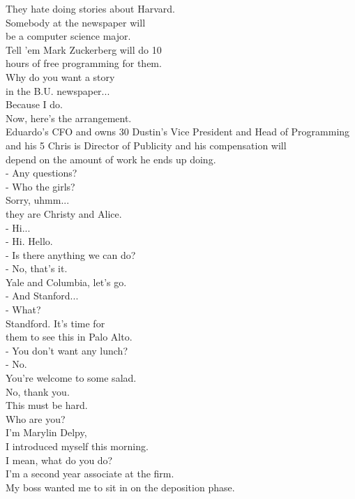 \documentclass{article}
\begin{document}
\begin{multicols}{3}
They hate doing stories about Harvard.\\
Somebody at the newspaper will\\
be a computer science major.\\
Tell 'em Mark Zuckerberg will do 10\\
hours of free programming for them.\\
Why do you want a story\\
in the B.U. newspaper...\\
Because I do.\\
Now, here's the arrangement.\\
Eduardo's CFO and owns 30%
Dustin's Vice President and Head of Programming\\
and his 5%
Chris is Director of Publicity and his compensation will\\
depend on the amount of work he ends up doing.\\
- Any questions?\\
- Who the girls?\\
Sorry, uhmm...\\
they are Christy and Alice.\\
- Hi...\\
- Hi. Hello.\\
- Is there anything we can do?\\
- No, that's it.\\
Yale and Columbia, let's go.\\
- And Stanford...\\
- What?\\
Standford. It's time for\\
them to see this in Palo Alto.\\
- You don't want any lunch?\\
- No.\\
You're welcome to some salad.\\
No, thank you.\\
This must be hard.\\
Who are you?\\
I'm Marylin Delpy,\\
I introduced myself this morning.\\
I mean, what do you do?\\
I'm a second year associate at the firm.\\
My boss wanted me to sit in on the deposition phase.\\

\end{multicols}
\end{document}
